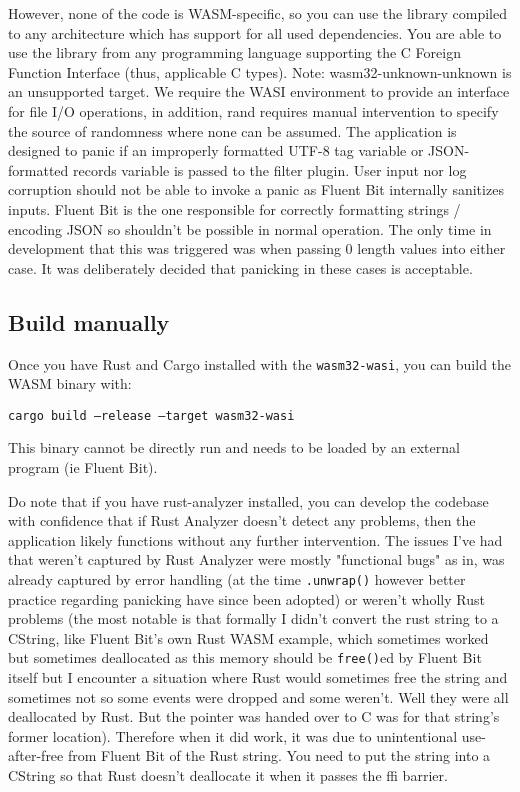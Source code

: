 However, none of the code is WASM-specific, so you can use the library compiled to any architecture which has support for all used dependencies. You are able to use the library from any programming language supporting the C Foreign Function Interface (thus, applicable C types). Note: wasm32-unknown-unknown is an unsupported target. We require the WASI environment to provide an interface for file I/O operations, in addition, rand requires manual intervention to specify the source of randomness where none can be assumed. The application is designed to panic if an improperly formatted UTF-8 tag variable or JSON-formatted records variable is passed to the filter plugin. User input nor log corruption should not be able to invoke a panic as Fluent Bit internally sanitizes inputs. Fluent Bit is the one responsible for correctly formatting strings / encoding JSON so shouldn't be possible in normal operation. The only time in development that this was triggered was when passing 0 length values into either case. It was deliberately decided that panicking in these cases is acceptable.
\subsection{Build manually}
Once you have Rust and Cargo installed with the \texttt{wasm32-wasi}, you can build the WASM binary with:

\texttt{cargo build --release --target wasm32-wasi}

This binary cannot be directly run and needs to be loaded by an external program (ie Fluent Bit).

Do note that if you have rust-analyzer installed, you can develop the codebase with confidence that if Rust Analyzer doesn't detect any problems, then the application likely functions without any further intervention. The issues I've had that weren't captured by Rust Analyzer were mostly "functional bugs" as in, was already captured by error handling (at the time \texttt{.unwrap()} however better practice regarding panicking have since been adopted) or weren't wholly Rust problems (the most notable is that formally I didn't convert the rust string to a CString, like Fluent Bit's own Rust WASM example, which sometimes worked but sometimes deallocated as this memory should be \texttt{free()}ed by Fluent Bit itself but I encounter a situation where Rust would sometimes free the string and sometimes not so some events were dropped and some weren't. Well they were all deallocated by Rust. But the pointer was handed over to C was for that string's former location). Therefore when it did work, it was due to unintentional use-after-free from Fluent Bit of the Rust string. You need to put the string into a CString so that Rust doesn't deallocate it when it passes the \acrlong{ffi} barrier. 

